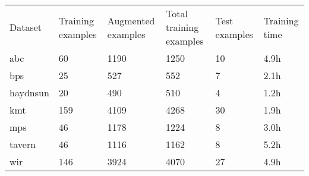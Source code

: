 \begin{tabular}{llllll}
Dataset        & Training examples & Augmented examples & Total training examples & Test examples & Training time \\
\gls{abc}      & 60                & 1190               & 1250                    & 10            & 4.9h          \\
\gls{bps}      & 25                & 527                & 552                     & 7             & 2.1h          \\
\gls{haydnsun} & 20                & 490                & 510                     & 4             & 1.2h          \\
\gls{kmt}      & 159               & 4109               & 4268                    & 30            & 1.9h          \\
\gls{mps}      & 46                & 1178               & 1224                    & 8             & 3.0h          \\
\gls{tavern}   & 46                & 1116               & 1162                    & 8             & 5.2h          \\
\gls{wir}      & 146               & 3924               & 4070                    & 27            & 4.9h         
\end{tabular}
